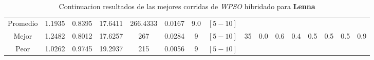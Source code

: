 \begin{table}[h!]
\begin{center}
\begin{tabular}{|c|c|c|c|c|c|c|c|c|c|c|c|c|c|c|c|}
        \hline
        \hline
            Promedio  & 1.1935 & 0.8395 & 17.6411 & 266.4333 & 0.0167 & 9.0 & $[5-10]$ &  &  &  &  &  &  &  & \\
            \cline{1-8}
            Mejor & 1.2482 & 0.8012  & 17.6257 & 267 & 0.0284 & 9 & $[5-10]$ & 35 & 0.0 & 0.6 & 0.4 & 0.5 & 0.5 & 0.5 & 0.9\\
            \cline{1-8}
            Peor & 1.0262 & 0.9745  & 19.2937 & 215 & 0.0056 & 9 & $[5-10]$ &  &  &  &  &  &  &  & \\
        \hline
        \end{tabular}
        \caption{Continuacion resultados de las mejores corridas de \emph{WPSO} hibridado para {\bf Lenna}}
        \label{tb:tablewpsohibimgc}
    \end{center}
\end{table}
